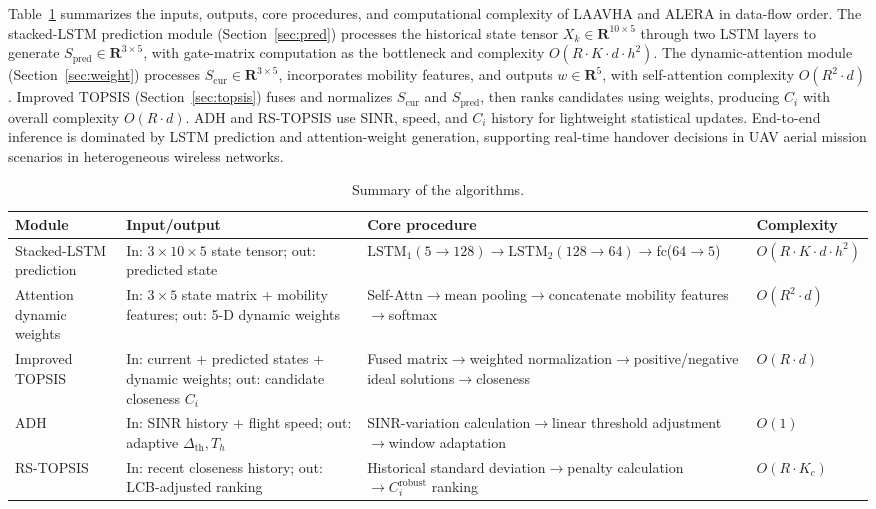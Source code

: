 \documentclass[final,3p,times,twocolumn]{elsarticle}
\newcommand{\arw}{$\rightarrow$\allowbreak\hspace{0pt}}
\begin{document}
Table~\ref{tab:complexity} summarizes the inputs, outputs, core procedures, and computational complexity of LAAVHA and ALERA in data-flow order. The stacked-LSTM prediction module (Section~\ref{sec:pred}) processes the historical state tensor $X_k\in\mathbf{R}^{10\times5}$ through two LSTM layers to generate $S_{\mathrm{pred}}\in\mathbf{R}^{3\times5}$, with gate-matrix computation as the bottleneck and complexity $O(R\cdot K\cdot d\cdot h^2)$. The dynamic-attention module (Section~\ref{sec:weight}) processes $S_{\mathrm{cur}}\in\mathbf{R}^{3\times5}$, incorporates mobility features, and outputs $w\in\mathbf{R}^5$, with self-attention complexity $O(R^2\cdot d)$. Improved TOPSIS (Section~\ref{sec:topsis}) fuses and normalizes $S_{\mathrm{cur}}$ and $S_{\mathrm{pred}}$, then ranks candidates using weights, producing $C_i$ with overall complexity $O(R\cdot d)$. ADH and RS-TOPSIS use SINR, speed, and $C_i$ history for lightweight statistical updates. End-to-end inference is dominated by LSTM prediction and attention-weight generation, supporting real-time handover decisions in UAV aerial mission scenarios in heterogeneous wireless networks.

\begin{table}[H]
\centering
\caption{Summary of the algorithms.}
\small
\begin{tabularx}{\textwidth}{>{\raggedright\arraybackslash}p{2.6cm}>{\raggedright\arraybackslash}X>{\raggedright\arraybackslash}X>{\raggedright\arraybackslash}p{2.3cm}}
\toprule
\textbf{Module} & \textbf{Input/output} & \textbf{Core procedure} & \textbf{Complexity} \\
\midrule
Stacked-LSTM prediction & In: $3\times10\times5$ state tensor; out: predicted state & $\mathrm{LSTM}_1(5\rightarrow128)\rightarrow\mathrm{LSTM}_2(128\rightarrow64)\rightarrow$fc($64\rightarrow5$) & $O(R\cdot K\cdot d\cdot h^2)$ \\
Attention dynamic weights & In: $3\times5$ state matrix + mobility features; out: 5-D dynamic weights & Self-Attn\arw{}mean pooling\arw{}concatenate mobility features\arw{}softmax & $O(R^2\cdot d)$ \\
Improved TOPSIS & In: current + predicted states + dynamic weights; out: candidate closeness $C_i$ & Fused matrix\arw{}weighted normalization\arw{}positive/negative ideal solutions\arw{}closeness & $O(R\cdot d)$ \\
ADH & In: SINR history + flight speed; out: adaptive $\Delta_{\mathrm{th}},T_h$ & SINR-variation calculation\arw{}linear threshold adjustment\arw{}window adaptation & $O(1)$ \\
RS-TOPSIS & In: recent closeness history; out: LCB-adjusted ranking & Historical standard deviation\arw{}penalty calculation$\rightarrow C_i^{\mathrm{robust}}$ ranking & $O(R\cdot K_c)$ \\
\bottomrule
\end{tabularx}
\label{tab:complexity}
\end{table}
\end{document}
